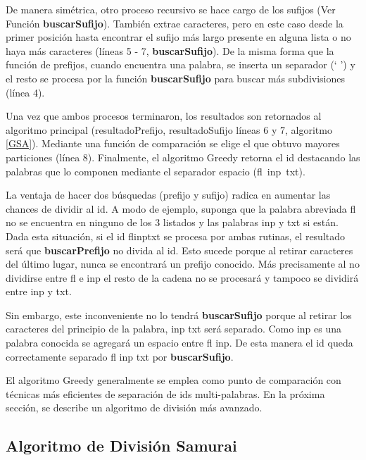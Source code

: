 De manera simétrica, otro proceso recursivo se hace cargo de los sufijos (Ver Función \textbf{buscarSufijo}). También extrae caracteres, pero en este caso desde la primer posición hasta encontrar el sufijo más largo presente en alguna lista o no haya más caracteres (líneas 5 - 7, \textbf{buscarSufijo}).
De la misma forma que la función de prefijos, cuando encuentra una palabra, se inserta un separador (` ') y el resto se procesa por la función \textbf{buscarSufijo} para buscar más subdivisiones (línea 4).



Una vez que ambos procesos terminaron, los resultados son retornados al algoritmo principal (\textsf{resultadoPrefijo, resultadoSufijo} líneas 6 y 7, algoritmo \ref{GSA}). Mediante una función de comparación se elige el que obtuvo mayores particiones (línea 8). Finalmente, el algoritmo Greedy retorna el id destacando las palabras que lo componen mediante el separador espacio \mbox{(\textsf{fl inp txt})}.

La ventaja de hacer dos búsquedas (prefijo y sufijo) radica en aumentar las chances de dividir al id. A modo de ejemplo, suponga que la palabra abreviada \textsf{fl}
no se encuentra en ninguno de los 3 listados y las palabras \textsf{inp} y \textsf{txt} si están. Dada esta situación, si el id \textsf{flinptxt} se procesa por ambas rutinas, el resultado será que \textbf{buscarPrefijo} no divida al id. Esto sucede porque al retirar caracteres del último lugar, nunca se encontrará un prefijo conocido. Más precisamente al no dividirse entre \textsf{fl} e \textsf{inp} el resto de la cadena no se procesará y tampoco se dividirá entre \textsf{inp} y \textsf{txt}. 

Sin embargo, este inconveniente no lo tendrá \textbf{buscarSufijo} porque al retirar los caracteres del principio de la palabra, \textsf{inp txt} será separado. Como \textsf{inp} es una palabra conocida se agregará un espacio entre \textsf{fl inp}. De esta manera el id queda correctamente separado \textsf{fl inp txt} por \textbf{buscarSufijo}.

El algoritmo Greedy generalmente se emplea como punto de comparación con técnicas más eficientes de separación de ids multi-palabras. En la próxima sección, se describe un algoritmo de división más avanzado.


\subsection{Algoritmo de División Samurai}
\label{sec:algSamu}

